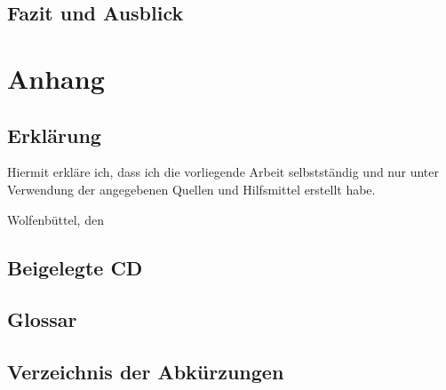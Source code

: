 \documentclass[
  a4paper,					    %
  twoside,
  DIV=calc,     				%
  bibliography=totoc,
  cleardoublepage=empty,
  ngerman,     					%
  final       					%
]{scrbook}
\begin{document}
\chapter{Fazit und Ausblick}
\label{sec:FazitAusblick}










\backmatter
\appendix
\part*{Anhang}


\chapter{Erklärung}
\label{sec:Erklärung}
Hiermit erkläre ich, dass ich die vorliegende Arbeit selbstständig und nur unter Verwendung der angegebenen Quellen und Hilfsmittel erstellt habe.
\vspace{2.5cm} \par
Wolfenbüttel, den %


\chapter{Beigelegte CD}
\label{sec:BeigelegteCD}







\chapter{Glossar}

\chapter{Verzeichnis der Abkürzungen}
\end{document}
